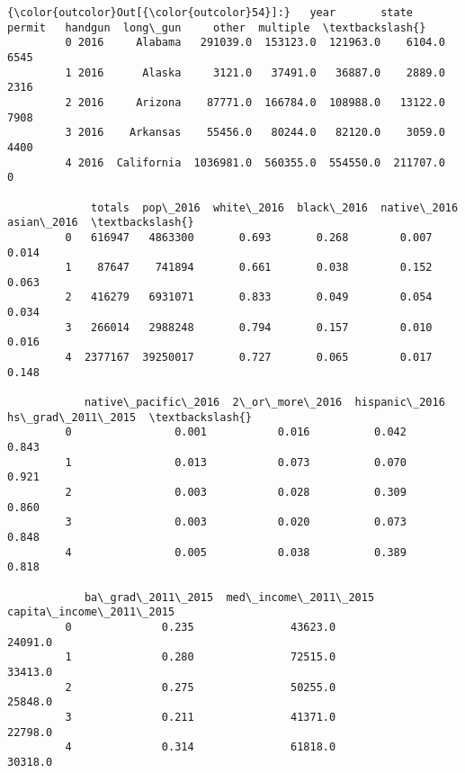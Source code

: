 \documentclass[11pt]{article}
\begin{document}
\begin{Verbatim}[commandchars=\\\{\}]
{\color{outcolor}Out[{\color{outcolor}54}]:}   year       state     permit   handgun  long\_gun     other  multiple  \textbackslash{}
         0 2016     Alabama   291039.0  153123.0  121963.0    6104.0      6545   
         1 2016      Alaska     3121.0   37491.0   36887.0    2889.0      2316   
         2 2016     Arizona    87771.0  166784.0  108988.0   13122.0      7908   
         3 2016    Arkansas    55456.0   80244.0   82120.0    3059.0      4400   
         4 2016  California  1036981.0  560355.0  554550.0  211707.0         0   
         
             totals  pop\_2016  white\_2016  black\_2016  native\_2016  asian\_2016  \textbackslash{}
         0   616947   4863300       0.693       0.268        0.007       0.014   
         1    87647    741894       0.661       0.038        0.152       0.063   
         2   416279   6931071       0.833       0.049        0.054       0.034   
         3   266014   2988248       0.794       0.157        0.010       0.016   
         4  2377167  39250017       0.727       0.065        0.017       0.148   
         
            native\_pacific\_2016  2\_or\_more\_2016  hispanic\_2016  hs\_grad\_2011\_2015  \textbackslash{}
         0                0.001           0.016          0.042              0.843   
         1                0.013           0.073          0.070              0.921   
         2                0.003           0.028          0.309              0.860   
         3                0.003           0.020          0.073              0.848   
         4                0.005           0.038          0.389              0.818   
         
            ba\_grad\_2011\_2015  med\_income\_2011\_2015  capita\_income\_2011\_2015  
         0              0.235               43623.0                  24091.0  
         1              0.280               72515.0                  33413.0  
         2              0.275               50255.0                  25848.0  
         3              0.211               41371.0                  22798.0  
         4              0.314               61818.0                  30318.0  
\end{Verbatim}
            
\end{document}
